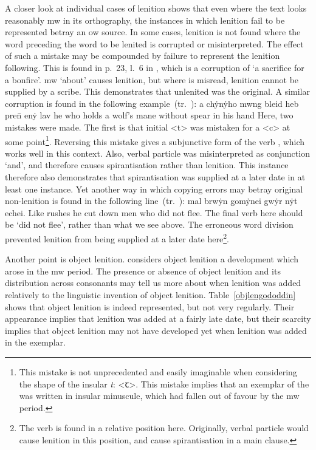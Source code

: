A closer look at individual cases of lenition shows that even where the text looks reasonably \gls{mw} in its orthography, the instances in which lenition fail to be represented  betray an \gls{ow} source. In some cases, lenition is not found where the word preceding the word to be lenited is corrupted or misinterpreted. The effect of such a mistake may be compounded by failure to represent the lenition following. This is found in p.\ 23, l.\ 6 in , which is a corruption of  `a sacrifice for a bonfire'. \gls{mw}  `about' causes lenition, but where  is misread, lenition cannot be supplied by a scribe. This demonstrates that unlenited  was the original. A similar corruption is found in the following example~(tr.\ \textcite[30]{jarman_y_1988}):
%
{a chẏnẏho mwng bleid heb pre\={n} enẏ lav}%
{he who holds a wolf's mane without spear in his hand}
Here, two mistakes were made. The first is that initial <t> was mistaken for a <c> at some point\footnote{This mistake is not unprecedented and easily imaginable when considering the shape of the insular \emph{t}: <ꞇ>. This mistake implies that an exemplar of the  was written in insular minuscule, which had fallen out of favour by the \gls{mw} period.}. Reversing this mistake gives a subjunctive form of the verb , which works well in this context. Also, verbal particle  was misinterpreted as conjunction  `and', and therefore causes spirantisation rather than lenition. This instance therefore also demonstrates that spirantisation was supplied at a later date in at least one instance. Yet another way in which copying errors may betray original non-lenition is found in the following line~(tr.\ \textcite[4]{jarman_y_1988}):
%
{mal brwẏn gomẏnei gwẏr nẏt echei.}%
{Like rushes he cut down men who did not flee. }
The final verb here should be  `did not flee', rather than what we see above. The erroneous word division prevented lenition from being supplied at a later date here\footnote{The verb  is found in a relative position here. Originally, verbal particle  would cause lenition in this position, and cause spirantisation in a main clause.}.

Another point is object lenition. \Textcite{van_sluis_development_2014} considers object lenition a development which arose in the \gls{mw} period. The presence or absence of object lenition and its distribution across consonants may tell us more about when lenition was added relatively to the linguistic invention of object lenition. Table~\ref{objlengododdin} shows that object lenition is indeed represented, but not very regularly. Their appearance implies that lenition was added at a fairly late date, but their scarcity implies that object lenition may not have developed yet when lenition was added in the exemplar.

